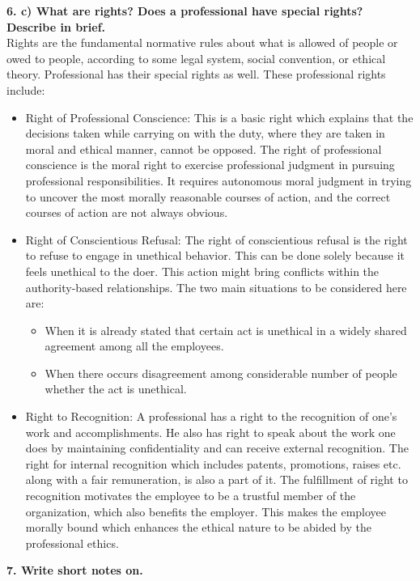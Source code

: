 \documentclass [12pt, a4paper]{article}
\begin{document}
\large
\textbf{6. c) What are rights? Does a professional have special rights? Describe in brief.}\\
\normalsize
Rights are the fundamental normative rules about what is allowed of people or owed to people, according to some legal system, social convention, or ethical theory. Professional has their special rights as well. These professional rights include:
\begin{itemize}
	\item Right of Professional Conscience: This is a basic right which explains that the decisions taken while carrying on with the duty, where they are taken in moral and ethical manner, cannot be opposed. The right of professional conscience is the moral right to exercise professional judgment in pursuing professional responsibilities. It requires autonomous moral judgment in trying to uncover the most morally reasonable courses of action, and the correct courses of action are not always obvious.
\item Right of Conscientious Refusal: The right of conscientious refusal is the right to refuse to engage in unethical behavior. This can be done solely because it feels unethical to the doer. This action might bring conflicts within the authority-based relationships. The two main situations to be considered here are:
	\begin{itemize}
		\item When it is already stated that certain act is unethical in a widely shared agreement among all the employees.
		\item When there occurs disagreement among considerable number of people whether the act is unethical.
	\end{itemize}
\item Right to Recognition: A professional has a right to the recognition of one’s work and accomplishments. He also has right to speak about the work one does by maintaining confidentiality and can receive external recognition. The right for internal recognition which includes patents, promotions, raises etc. along with a fair remuneration, is also a part of it. The fulfillment of right to recognition motivates the employee to be a trustful member of the organization, which also benefits the employer. This makes the employee morally bound which enhances the ethical nature to be abided by the professional ethics.

\end{itemize}

\large
\textbf{7. Write short notes on.}\\
\end{document}
